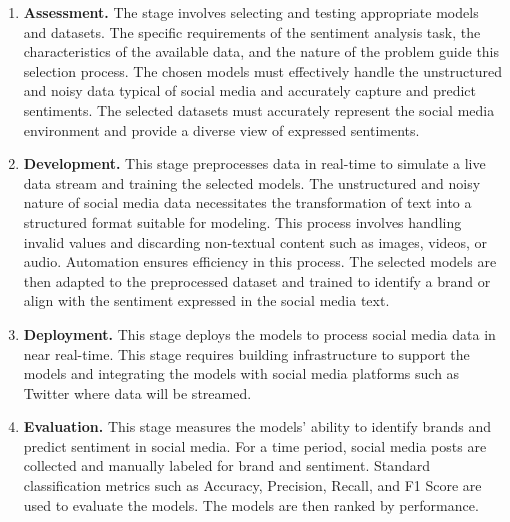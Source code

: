 \documentclass{article}
\begin{document}
\begin{enumerate}[leftmargin=*]

    \item \textbf{Assessment.} The stage involves selecting and testing
          appropriate models and datasets. The specific requirements of the
          sentiment
          analysis task, the characteristics of the available data, and the
          nature of the
          problem guide this selection process. The chosen models must
          effectively handle
          the unstructured and noisy data typical of social media and
          accurately capture
          and predict sentiments. The selected datasets must accurately
          represent the
          social media environment and provide a diverse view of expressed
          sentiments.

    \item \textbf{Development.} This stage preprocesses data in real-time to
          simulate a live data stream and training the selected models. The
          unstructured
          and noisy nature of social media data necessitates the transformation
          of text
          into a structured format suitable for modeling. This process involves
          handling
          invalid values and discarding non-textual content such as images,
          videos, or
          audio. Automation ensures efficiency in this process. The selected
          models are
          then adapted to the preprocessed dataset and trained to identify a
          brand or
          align with the sentiment expressed in the social media text.

    \item \textbf{Deployment.} This stage deploys the models to process social
          media data in near real-time. This stage requires building
          infrastructure to
          support the models and integrating the models with social media
          platforms such
          as Twitter where data will be streamed.

    \item \textbf{Evaluation.} This stage measures the models' ability to
          identify brands and predict sentiment in social media. For a time
          period,
          social media posts are collected and manually labeled for brand and
          sentiment.
          Standard classification metrics such as Accuracy, Precision, Recall,
          and F1
          Score are used to evaluate the models. The models are then ranked by
          performance.

\end{enumerate}
\end{document}
